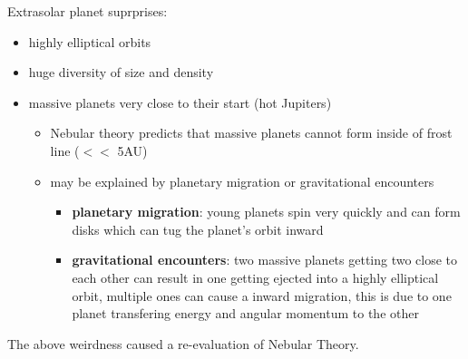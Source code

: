 Extrasolar planet suprprises:
\begin{itemize}
\item highly elliptical orbits
\item huge diversity of size and density
\item massive planets very close to their start (hot Jupiters)
\begin{itemize}
\item Nebular theory predicts that massive planets cannot form inside of frost line ($<<$ 5AU)
\item may be explained by planetary migration or gravitational encounters
\begin{itemize}
\item \textbf{planetary migration}: young planets spin very quickly and can form disks which can tug the planet's orbit inward
\item \textbf{gravitational encounters}: two massive planets getting two close to each other can result in one getting ejected into a highly elliptical orbit, multiple ones can cause a inward migration, this is due to one planet transfering energy and angular momentum to the other
\end{itemize}
\end{itemize}
\end{itemize}
The above weirdness caused a re-evaluation of Nebular Theory.
